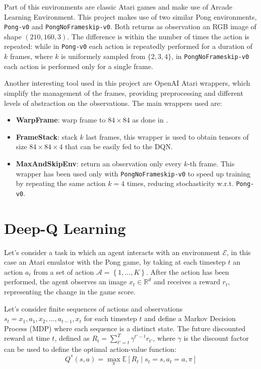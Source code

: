 \documentclass[a4paper]{article}
\numberwithin{equation}{section} %
\numberwithin{figure}{section} %
\numberwithin{table}{section} %
\theoremstyle{definition}
\begin{document}
Part of this environments are classic Atari games and make use of Arcade Learning
Environment. This project makes use of two similar Pong environments,
\texttt{Pong-v0} and \texttt{PongNoFrameskip-v0}. Both returns as observation
an RGB image of shape $(210, 160, 3)$. The difference is within the number of times
the action is repeated: while in \texttt{Pong-v0} each action is repeatedly
performed for a duration of $k$ frames, where $k$ is uniformely sampled from
$\{ 2, 3, 4 \}$, in \texttt{PongNoFrameskip-v0} each action is performed only for
a single frame.

Another interesting tool used in this project are OpenAI Atari
wrappers\cite{openai-gym-baselines}, which simplify the management of the frames,
providing preprocessing and different levels of abstraction on the observations.
The main wrappers used are:
\begin{itemize}
	\item \textbf{WarpFrame}: warp frame to $84 \times 84$ as done in \cite{mnih2015humanlevel}.
	\item \textbf{FrameStack}: stack $k$ last frames, this wrapper is used to
		obtain tensors of size $84 \times 84 \times 4$ that can be easily fed to the DQN.
	\item \textbf{MaxAndSkipEnv}: return an observation only every $k$-th frame. This wrapper has
		been used only with \texttt{PongNoFrameskip-v0} to speed up training by repeating
		the same action $k=4$ times, reducing stochasticity w.r.t. \texttt{Pong-v0}.
\end{itemize}


\section{Deep-Q Learning}

Let's consider a task in which an agent interacts with an environment $\mathcal{E}$,
in this case an Atari emulator with the Pong game, by taking at each timestep $t$
an action $a_t$ from a set of action $ \mathcal{A} = \left\{ 1, \dots, K \right\} $.
After the action has been performed, the agent observes
an image $x_t \in \mathbb{R}^d$ and receives a reward $r_t$, representing the
change in the game score.

Let's consider finite sequences of actions and observations $s_t = x_1, a_1, x_2, \dots,
a_{t-1}, x_t$ for each timestep $t$ and define a Markov Decision Process (MDP) where
each sequence is a distinct state. The future discounted reward
at time $t$, defined as $R_t = \sum_{t'=t}^{T} \gamma^{t'-t} r_{t'}$, where $\gamma$ is the
discount factor can be used to define the optimal action-value function:
\begin{equation*}
	Q^*(s, a) = \max_\pi \mathbb{E} \left[ R_t \mid s_t = s, a_t = a, \pi \right]
\end{equation*}
\end{document}
